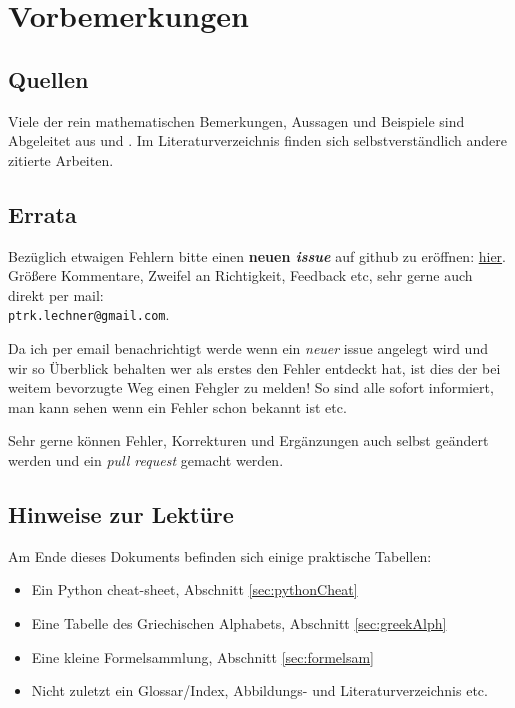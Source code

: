\chapter*{Vorbemerkungen}

\section*{Quellen}

Viele der rein mathematischen Bemerkungen, Aussagen und Beispiele sind Abgeleitet aus \cite{merziger2024repetitorium} und \cite{gollmann2017mathematik}. Im Literaturverzeichnis finden sich selbstverständlich andere zitierte Arbeiten.

\section*{Errata}

Bezüglich etwaigen Fehlern bitte einen \textbf{neuen \emph{issue}} auf github zu eröffnen: \href{https://github.com/hrtlacek/matheFuerTonmeisterinnen/issues}{hier}. Größere Kommentare, Zweifel an Richtigkeit, Feedback etc, sehr gerne auch direkt per mail: \\
\texttt{ptrk.lechner@gmail.com}.

Da ich per email benachrichtigt werde wenn ein \emph{neuer} issue angelegt wird und wir so Überblick behalten wer als erstes den Fehler entdeckt hat, ist dies der bei weitem bevorzugte Weg einen Fehgler zu melden! So sind alle sofort informiert, man kann sehen wenn ein Fehler schon bekannt ist etc.

Sehr gerne können Fehler, Korrekturen und Ergänzungen auch selbst geändert werden und ein \emph{pull request} gemacht werden.

\section*{Hinweise zur Lektüre}

Am Ende dieses Dokuments befinden sich einige praktische Tabellen:
\begin{itemize}
\item Ein Python cheat-sheet, Abschnitt \ref{sec:pythonCheat}
\item Eine Tabelle des Griechischen Alphabets, Abschnitt \ref{sec:greekAlph}
\item Eine kleine Formelsammlung, Abschnitt \ref{sec:formelsam}
\item Nicht zuletzt ein Glossar/Index, Abbildungs- und Literaturverzeichnis etc.
\end{itemize} 

